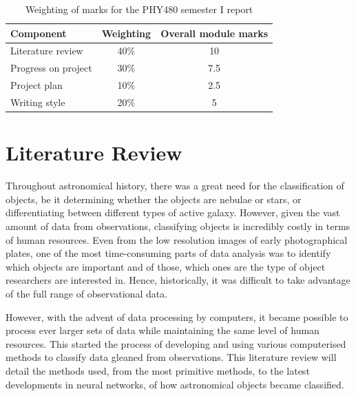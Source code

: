 \documentclass[a4paper,11pt]{article}
\begin{document}
\begin{table}[h]
\caption{Weighting of marks for the PHY480 semester I report}
\begin{center}
\begin{tabular}{|l|c|c|}
\hline
Component & Weighting & Overall module marks \\
\hline
Literature review & 40\% & 10\\
Progress on project &30\%& 7.5\\
Project plan & 10\% & 2.5\\
Writing style & 20\% & 5\\
\hline
\end{tabular}
\end{center}
\label{mark weighting}
\end{table}




\section{Literature Review}
Throughout astronomical history, there was a great need for the classification of objects, be it determining whether the objects are nebulae or stars, or differentiating between different types of active galaxy. However, given the vast amount of data from observations, classifying objects is incredibly costly in terms of human resources. Even from the low resolution images of early photographical plates, one of the most time-consuming parts of data analysis was to identify which objects are important and of those, which ones are the type of object researchers are interested in. Hence, historically, it was difficult to take advantage of the full range of observational data.  

However, with the advent of data processing by computers, it became possible to process ever larger sets of data while maintaining the same level of human resources. This started the process of developing and using various computerised methods to classify data gleaned from observations. This literature review will detail the methods used, from the most primitive methods, to the latest developments in neural networks, of how astronomical objects became classified.
\end{document}

